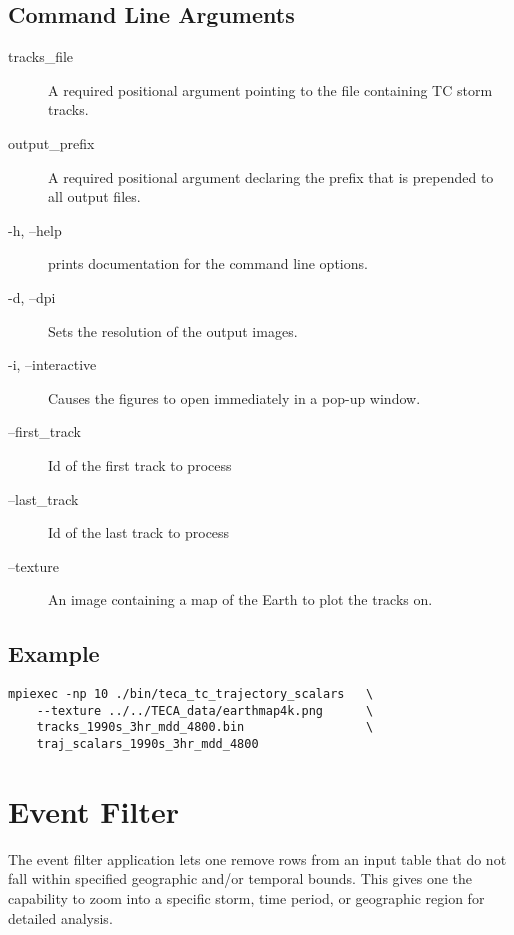 \documentclass[a4paper,10pt,DIV=12]{scrreprt}
\begin{document}
\subsection{Command Line Arguments}
\begin{description}
\item[tracks\_file] A required positional argument pointing to the file containing TC storm tracks.
\item[output\_prefix] A required positional argument declaring the prefix that is prepended to all output files.
\item[-h, --help] prints documentation for the command line options.
\item[-d, --dpi] Sets the resolution of the output images.
\item[-i, --interactive] Causes the figures to open immediately in a pop-up window.
\item[--first\_track] Id of the first track to process
\item[--last\_track] Id of the last track to process
\item[--texture] An image containing a map of the Earth to plot the tracks on.
\end{description}

\subsection{Example}
\begin{verbatim}
mpiexec -np 10 ./bin/teca_tc_trajectory_scalars   \
    --texture ../../TECA_data/earthmap4k.png      \
    tracks_1990s_3hr_mdd_4800.bin                 \
    traj_scalars_1990s_3hr_mdd_4800
\end{verbatim}

\section{Event Filter}
The event filter application lets one remove rows from an input table that do not fall within specified geographic and/or temporal bounds. This gives one the capability to zoom into a specific storm, time period, or geographic region for detailed analysis.
\end{document}
